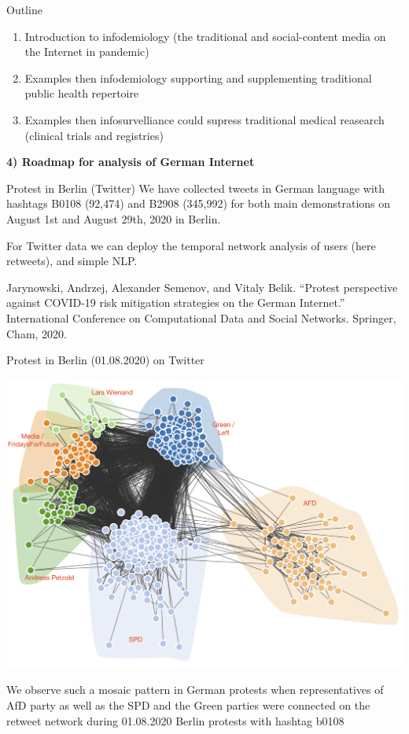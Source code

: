 \documentclass[
  10pt,
  ignorenonframetext,
  a4paper,handout]{beamer}
\begin{document}
\begin{frame}{Outline}
\protect\hypertarget{outline-3}{}
\Large
\pause

\begin{enumerate}
[1)]
\item
  Introduction to infodemiology (the traditional and social-content
  media on the Internet in pandemic)
\item
  Examples then infodemiology supporting and supplementing traditional
  public health repertoire
\item
  Examples then infosurvelliance could supress traditional medical
  reasearch (clinical trials and registries)
\end{enumerate}

\textbf{4) Roadmap for analysis of German Internet }

\large

\pause
\end{frame}

\begin{frame}{Protest in Berlin (Twitter)}
\protect\hypertarget{protest-in-berlin-twitter}{}
We have collected tweets in German language with hashtags B0108 (92,474)
and B2908 (345,992) for both main demonstrations on August 1st and
August 29th, 2020 in Berlin.

For Twitter data we can deploy the temporal network analysis of users
(here retweets), and simple NLP.

Jarynowski, Andrzej, Alexander Semenov, and Vitaly Belik. ``Protest
perspective against COVID-19 risk mitigation strategies on the German
Internet.'' International Conference on Computational Data and Social
Networks. Springer, Cham, 2020.
\end{frame}

\begin{frame}{Protest in Berlin (01.08.2020) on Twitter}
\protect\hypertarget{protest-in-berlin-01.08.2020-on-twitter}{}
\begin{center}\includegraphics[width=0.85\linewidth]{b0108_comminities} \end{center}

We observe such a mosaic pattern in German protests when representatives
of AfD party as well as the SPD and the Green parties were connected on
the retweet network during 01.08.2020 Berlin protests with hashtag b0108
\end{frame}
\end{document}
